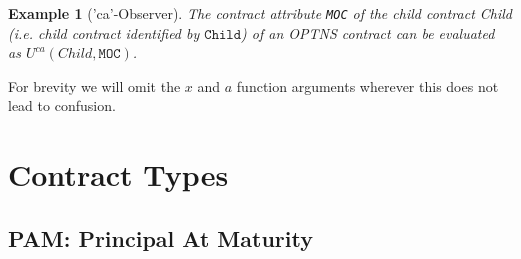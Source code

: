 \documentclass[9pt,oneside]{amsart}
\newtheorem{example}{Example}
\newcommand{\attr}[1]{\texttt{#1}}
\newcommand{\cldca}[2]{U^{ca}(#1,#2)}
\begin{document}
\begin{multicols}{2}
\begin{example}['ca'-Observer] The contract attribute \attr{MOC} of the child contract \textit{Child} (i.e. child contract identified by $\texttt{Child}$) of an OPTNS contract can be evaluated as $\cldca{Child}{\attr{MOC}}$.
\end{example}

For brevity we will omit the $x$ and $a$ function arguments wherever this does not lead to confusion.




\end{multicols}
\newpage




\section{Contract Types}


\subsection{PAM: Principal At Maturity}\label{sec:pam}


\end{document}
